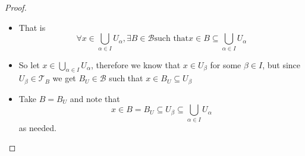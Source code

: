 \begin{proof}
\begin{itemize}
\begin{itemize}
            \item That is
                \[
                    \forall x \in \bigcup_{\alpha \in I} U_{\alpha}, \exists B
                    \in \mathcal{B} \text{such that} x \in B \subseteq
                    \bigcup_{\alpha \in I} U_{\alpha}
                \]
            \item So let \(x \in \bigcup_{\alpha \in I} U_{\alpha}\), therefore
            we know that \(x \in U_{\beta}\) for some \(\beta \in I\), but since
            \(U _{\beta} \in \mathcal{T}_{B}\) we get \(B_{U} \in \mathcal{B}\)
            such that \(x \in B_{U} \subseteq U_{\beta}\)
            \item Take \(B = B_{U}\) and note that
                \[
                x \in B = B_{U} \subseteq U_{\beta} \subseteq \bigcup_{\alpha
                \in I} U _{\alpha}
                \]
                as needed.
        \end{itemize}
    \end{itemize}
\end{proof}
